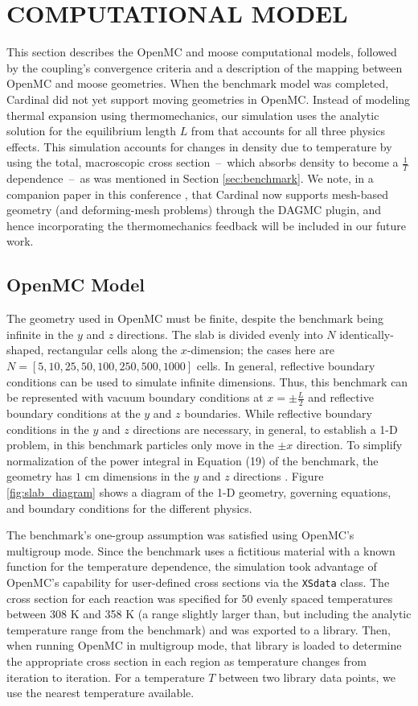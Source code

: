 \documentclass[letterpaper]{mc2023}
\begin{document}
\section{COMPUTATIONAL MODEL}\label{sec:model}
This section describes the OpenMC and \gls{moose} computational models, followed by the coupling's convergence criteria and
a description of the mapping between OpenMC and \gls{moose} geometries. When the benchmark model was completed, Cardinal did
not yet support moving geometries in OpenMC. Instead of modeling thermal expansion using thermomechanics, our simulation uses
the analytic solution for the equilibrium length $L$ from \cite{analytical-benchmark} that accounts for all three physics
effects. This simulation accounts for changes in density due to temperature by using the total, macroscopic cross section\ --\
which absorbs density to become a $\frac{1}{T}$ dependence\ --\ as was mentioned in Section \ref{sec:benchmark}. We note, in
a companion paper in this conference \cite{novak-2023}, that Cardinal now supports mesh-based geometry (and deforming-mesh
problems) through the DAGMC plugin, and hence incorporating the thermomechanics feedback will be included in our future work.

\subsection{OpenMC Model}
\label{sec:model:OpenMC}
The geometry used in OpenMC must be finite, despite the benchmark being infinite in the $y$ and $z$ directions. The slab is
divided evenly into $N$ identically-shaped, rectangular cells along the $x$-dimension; the cases here are $N=[5, 10, 25, 50, 100, 
250, 500, 1000]$ cells. In general, reflective boundary conditions can be used to simulate infinite dimensions. Thus, this
benchmark can be represented with vacuum boundary conditions at $x=\pm \frac{L}{2}$ and reflective boundary conditions at
the $y$ and $z$ boundaries. While reflective boundary conditions in the $y$ and $z$ directions are necessary, in general, to
establish a 1-D problem, in this benchmark particles only move in the $\pm x$ direction. To simplify normalization of the power
integral in Equation (19) of the benchmark, the geometry has $1$ cm dimensions in the $y$ and $z$ directions \cite{analytical-benchmark}.
Figure \ref{fig:slab_diagram} shows a diagram of the 1-D geometry, governing equations, and boundary conditions for the different physics.

The benchmark's one-group assumption was satisfied using OpenMC's multigroup mode. Since the benchmark uses a fictitious material
with a known function for the temperature dependence, the simulation took advantage of OpenMC's capability for user-defined
cross sections via the \texttt{XSdata} class. The cross section for each reaction was specified for 50 evenly spaced temperatures
between 308 K and 358 K (a range slightly larger than, but including the  analytic temperature range from the benchmark) and was
exported to a library. Then, when running OpenMC in multigroup mode, that library is loaded to determine the appropriate cross
section in each region as temperature changes from iteration to iteration. For a temperature $T$ between two library data points,
we use the nearest temperature available.
\end{document}
